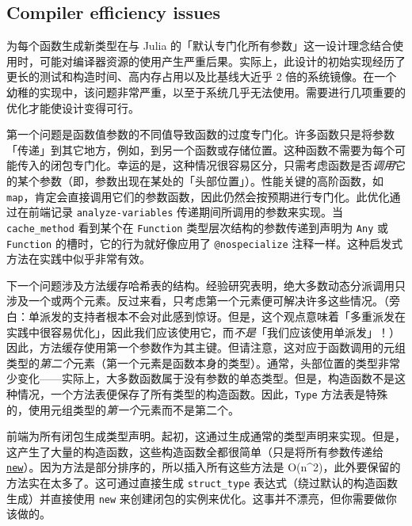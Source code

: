 \hypertarget{1871194914272945034}{}


\subsection{Compiler efficiency issues}



为每个函数生成新类型在与 Julia 的「默认专门化所有参数」这一设计理念结合使用时，可能对编译器资源的使用产生严重后果。实际上，此设计的初始实现经历了更长的测试和构造时间、高内存占用以及比基线大近乎 2 倍的系统镜像。在一个幼稚的实现中，该问题非常严重，以至于系统几乎无法使用。需要进行几项重要的优化才能使设计变得可行。



第一个问题是函数值参数的不同值导致函数的过度专门化。许多函数只是将参数「传递」到其它地方，例如，到另一个函数或存储位置。这种函数不需要为每个可能传入的闭包专门化。幸运的是，这种情况很容易区分，只需考虑函数是否\emph{调用}它的某个参数（即，参数出现在某处的「头部位置」）。性能关键的高阶函数，如 \texttt{map}，肯定会直接调用它们的参数函数，因此仍然会按预期进行专门化。此优化通过在前端记录 \texttt{analyze-variables} 传递期间所调用的参数来实现。当 \texttt{cache\_method} 看到某个在 \texttt{Function} 类型层次结构的参数传递到声明为 \texttt{Any} 或 \texttt{Function} 的槽时，它的行为就好像应用了 \texttt{@nospecialize} 注释一样。这种启发式方法在实践中似乎非常有效。



下一个问题涉及方法缓存哈希表的结构。经验研究表明，绝大多数动态分派调用只涉及一个或两个元素。反过来看，只考虑第一个元素便可解决许多这些情况。（旁白：单派发的支持者根本不会对此感到惊讶。但是，这个观点意味着「多重派发在实践中很容易优化」，因此我们应该使用它，而\emph{不是}「我们应该使用单派发」！）因此，方法缓存使用第一个参数作为其主键。但请注意，这对应于函数调用的元组类型的\emph{第二个}元素（第一个元素是函数本身的类型）。通常，头部位置的类型非常少变化——实际上，大多数函数属于没有参数的单态类型。但是，构造函数不是这种情况，一个方法表便保存了所有类型的构造函数。因此，\texttt{Type} 方法表是特殊的，使用元组类型的\emph{第一个}元素而不是第二个。



前端为所有闭包生成类型声明。起初，这通过生成通常的类型声明来实现。但是，这产生了大量的构造函数，这些构造函数全都很简单（只是将所有参数传递给 \hyperlink{13888762393600028594}{\texttt{new}}）。因为方法是部分排序的，所以插入所有这些方法是 O(n{\textasciicircum}2)，此外要保留的方法实在太多了。这可通过直接生成 \texttt{struct\_type} 表达式（绕过默认的构造函数生成）并直接使用 \texttt{new} 来创建闭包的实例来优化。这事并不漂亮，但你需要做你该做的。



